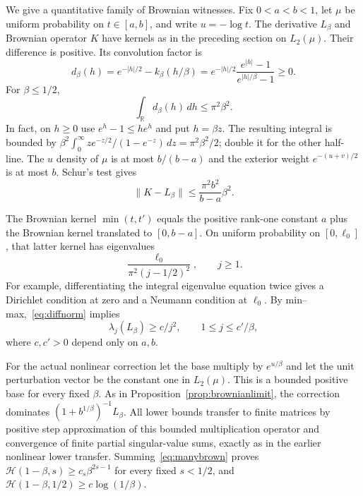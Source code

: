 \documentclass[11pt]{article}
\numberwithin{equation}{section}
\newcommand{\R}{\mathbb R}
\newcommand{\cH}{\mathcal H}
\begin{document}
We give a quantitative family of Brownian witnesses. Fix
$0<a<b<1$, let $\mu$ be uniform probability on $t\in[a,b]$, and
write $u=-\log t$. The derivative $L_\beta$ and Brownian operator
$K$ have kernels as in the preceding section on $L_2(\mu)$.
Their difference is positive. Its convolution factor is
\begin{equation}\label{eq:diffkernel}
 d_\beta(h)=e^{-|h|/2}-k_\beta(h/\beta)
 =e^{-|h|/2}\frac{e^{|h|}-1}{e^{|h|/\beta}-1}\ge0.
\end{equation}
For $\beta\le1/2$,
\begin{equation}\label{eq:dL1}
 \int_\R d_\beta(h)\,dh\le\pi^2\beta^2.
\end{equation}
In fact, on $h\ge0$ use $e^h-1\le he^h$ and put $h=\beta z$.
The resulting integral is bounded by
$\beta^2\int_0^\infty z e^{-z/2}/(1-e^{-z})\,dz
=\pi^2\beta^2/2$; double it for the other half-line.
The $u$ density of $\mu$ is at most $b/(b-a)$ and the exterior
weight $e^{-(u+v)/2}$ is at most $b$. Schur's test gives
\begin{equation}\label{eq:diffnorm}
 \|K-L_\beta\|\le\frac{\pi^2b^2}{b-a}\beta^2.
\end{equation}

The Brownian kernel $\min(t,t')$ equals the positive rank-one
constant $a$ plus the Brownian kernel translated to $[0,b-a]$.
On uniform probability on $[0,\ell_0]$, that latter kernel has
eigenvalues
\begin{equation}\label{eq:explicitbrown}
 \frac{\ell_0}{\pi^2(j-1/2)^2},\qquad j\ge1.
\end{equation}
For example, differentiating the integral eigenvalue equation twice
gives a Dirichlet condition at zero and a Neumann condition at
$\ell_0$. By min--max,~\eqref{eq:diffnorm} implies
\begin{equation}\label{eq:manybrown}
 \lambda_j(L_\beta)\ge c/j^2,
 \qquad 1\le j\le c'/\beta,
\end{equation}
where $c,c'>0$ depend only on $a,b$.

For the actual nonlinear correction let the base multiply by
$e^{u/\beta}$ and let the unit perturbation vector be the constant
one in $L_2(\mu)$. This is a bounded positive base for every fixed
$\beta$. As in Proposition~\ref{prop:brownianlimit}, the correction
dominates $(1+b^{1/\beta})^{-1}L_\beta$.
All lower bounds transfer to finite matrices by positive step
approximation of this bounded multiplication operator and convergence
of finite partial singular-value sums, exactly as in the earlier
nonlinear lower transfer. Summing~\eqref{eq:manybrown} proves
$\cH(1-\beta,s)\ge c_s\beta^{2s-1}$ for every fixed $s<1/2$,
and $\cH(1-\beta,1/2)\ge c\log(1/\beta)$.
\end{document}
